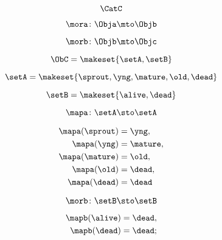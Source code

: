 \begin{forslides}
    \begin{equation}
        \label{eq:semicats-slides-74}
        \CatC
    \end{equation}

    \begin{equation}
        \label{eq:semicats-slides-75}
        \mora\colon \Obja \mto \Objb
    \end{equation}

    \begin{equation}
        \label{eq:semicats-slides-76}
        \morb\colon \Objb \mto \Objc
    \end{equation}

    \begin{equation}
        \label{eq:semicats-slides-77}
        \ObC = \makeset{ \setA, \setB }
    \end{equation}

    \begin{equation}
        \label{eq:semicats-slides-78}
        \setA = \makeset{ \sprout, \yng, \mature, \old, \dead }
    \end{equation}

    \begin{equation}
        \label{eq:semicats-slides-79}
        \setB = \makeset{ \alive, \dead }
    \end{equation}

    \begin{equation}
        \label{eq:semicats-slides-80}
        \mapa \colon \setA \sto \setA
    \end{equation}

    \begin{equation}
        \label{eq:semicats-slides-81}
        \begin{aligned}
            \mapa(\sprout) & =  \yng, \\
            \mapa(\yng)    & =  \mature, \\
            \mapa(\mature) & =  \old, \\
            \mapa( \old)   & = \dead, \\
            \mapa(\dead)   & = \dead
        \end{aligned}
    \end{equation}

    \begin{equation}
        \label{eq:semicats-slides-82}
        \morb \colon \setB \sto \setB
    \end{equation}

    \begin{equation}
        \label{eq:semicats-slides-83}
        \begin{aligned}
            \mapb(\alive) & =  \dead, \\
            \mapb(\dead)  & =  \dead;
        \end{aligned}
    \end{equation}


\end{forslides}
